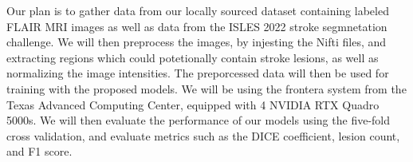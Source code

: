 \par Our plan is to gather data from our locally sourced dataset containing
labeled FLAIR MRI images as well as data from the ISLES 2022 stroke segmnetation challenge. 
We will then preprocess the images, by injesting the Nifti files, and extracting
regions which could potetionally contain stroke lesions, as well as  
normalizing the image intensities. The preporcessed data will then be used
for training with the proposed models. We will be using the frontera system from
the Texas Advanced Computing Center, equipped with 4 NVIDIA RTX Quadro 5000s.
We will then evaluate the performance of our models using the five-fold cross validation, 
and evaluate metrics such as the DICE coefficient, lesion count, and F1 score.